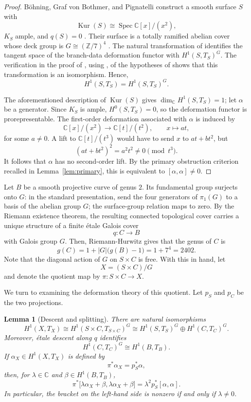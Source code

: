 \documentclass[11pt]{amsart}
\numberwithin{equation}{section}
\theoremstyle{plain}
\newtheorem{lemma}[theorem]{Lemma}
\theoremstyle{definition}
\newcommand{\C}{\mathbb{C}}
\newcommand{\Z}{\mathbb{Z}}
\DeclareMathOperator{\Kur}{Kur}
\DeclareMathOperator{\Spec}{Spec}
\begin{document}
\begin{proof}
B\"ohning, Graf von Bothmer, and Pignatelli construct a smooth surface $S$ with
$$\Kur(S)\cong\Spec\C[x]/(x^2),$$
$K_S$ ample, and $q(S)=0$ \cite[Thm.~1.1 and Thms.~6.3, 6.5]{BVP}. Their surface is a totally ramified abelian cover whose deck group is $G\cong(\Z/7)^4$ \cite[Cor.~5.4]{BVP}. The natural transformation of \cite[Lem.~2.11]{BVP} identifies the tangent space of the branch-data deformation functor with $H^1(S,T_S)^G$. The verification in the proof of \cite[Thm.~5.5]{BVP}, using \cite[Thm.~3.19]{BVP}, of the hypotheses of \cite[Cor.~2.13]{BVP} shows that this transformation is an isomorphism. Hence,
$$H^1(S,T_S)=H^1(S,T_S)^G.$$

The aforementioned description of $\Kur(S)$ gives $\dim_{\C}H^1(S,T_S)=1$; let $\alpha$ be a generator. Since $K_S$ is ample, $H^0(S,T_S)=0$, so the deformation functor is prorepresentable. The first-order deformation associated with $\alpha$ is induced by
$$\C[x]/(x^2)\longrightarrow\C[t]/(t^2),
\qquad x\longmapsto at,$$
for some $a\neq0$. A lift to $\C[t]/(t^3)$ would have to send $x$ to $at+bt^2$, but
$$(at+bt^2)^2=a^2t^2\neq0\pmod{t^3}.$$
It follows that $\alpha$ has no second-order lift. By the primary obstruction criterion recalled in Lemma~\ref{lem:primary}, this is equivalent to $[\alpha,\alpha]\neq0$.
\end{proof}

Let $B$ be a smooth projective curve of genus $2$. Its fundamental group surjects onto $G$: in the standard presentation, send the four generators of $\pi_1(G)$ to a basis of the abelian group $G$; the surface-group relation maps to zero. By the Riemann existence theorem, the resulting connected topological cover carries a unique structure of a finite \'etale Galois cover
$$q\colon C\longrightarrow B$$
with Galois group $G$. Then, Riemann-Hurwitz gives that the genus of $C$ is 
$$g(C)=1+|G|\bigl(g(B)-1\bigr)=1+7^4=2402.$$
Note that the diagonal action of $G$ on $S\times C$ is free. With this in hand, let
$$X=(S\times C)/G$$
and denote the quotient map by $\pi\colon S\times C\to X$.

We turn to examining the deformation theory of this quotient. Let $p_S$ and $p_C$ be the two projections.

\begin{lemma}[Descent and splitting]\label{lem:descent}
There are natural isomorphisms
$$H^1(X,T_X)\cong H^1(S\times C,T_{S\times C})^G
\cong H^1(S,T_S)^G\oplus H^1(C,T_C)^G.
$$
Moreover, \'etale descent along $q$ identifies
$$
H^1(C,T_C)^G\cong H^1(B,T_B).
$$
If $\alpha_X\in H^1(X,T_X)$ is defined by
$$
\pi^*\alpha_X=p_S^*\alpha,
$$
then, for $\lambda\in\C$ and $\beta\in H^1(B,T_B)$,
\begin{equation}\label{eq:bracket-splitting}
\pi^*\bigl[\lambda\alpha_X+\beta,\lambda\alpha_X+\beta\bigr]
=\lambda^2p_S^*[\alpha,\alpha].
\end{equation}
In particular, the bracket on the left-hand side is nonzero if and only if $\lambda\neq0$.
\end{lemma}
\end{document}
